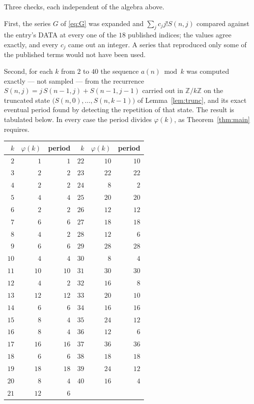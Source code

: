 \documentclass[11pt,a4paper]{article}
\theoremstyle{plain}
\theoremstyle{definition}
\begin{document}
Three checks, each independent of the algebra above.

First, the series $G$ of \eqref{eq:G} was expanded and $\sum_j c_j j! S(n,j)$ compared
against the entry's DATA at every one of the $18$ published indices; the values
agree exactly, and every $c_j$ came out an integer. A series that reproduced only some of
the published terms would not have been used.

Second, for each $k$ from $2$ to $40$ the sequence $a(n)\bmod k$ was computed exactly
--- not sampled --- from the recurrence $S(n,j)=j\,S(n-1,j)+S(n-1,j-1)$ carried out in
$\mathbb{Z}/k\mathbb{Z}$ on the truncated state
$\bigl(S(n,0),\dots,S(n,k-1)\bigr)$ of Lemma~\ref{lem:trunc}, and its exact eventual
period found by detecting the repetition of that state. The result is tabulated below.
In every case the period divides $\varphi(k)$, as Theorem~\ref{thm:main} requires.

\begin{center}\small
\begin{tabular}{rrr@{\qquad\qquad}rrr}
$k$ & $\varphi(k)$ & period & $k$ & $\varphi(k)$ & period \\ \hline
$2$ & $1$ & $1$ & $22$ & $10$ & $10$ \\
$3$ & $2$ & $2$ & $23$ & $22$ & $22$ \\
$4$ & $2$ & $2$ & $24$ & $8$ & $2$ \\
$5$ & $4$ & $4$ & $25$ & $20$ & $20$ \\
$6$ & $2$ & $2$ & $26$ & $12$ & $12$ \\
$7$ & $6$ & $6$ & $27$ & $18$ & $18$ \\
$8$ & $4$ & $2$ & $28$ & $12$ & $6$ \\
$9$ & $6$ & $6$ & $29$ & $28$ & $28$ \\
$10$ & $4$ & $4$ & $30$ & $8$ & $4$ \\
$11$ & $10$ & $10$ & $31$ & $30$ & $30$ \\
$12$ & $4$ & $2$ & $32$ & $16$ & $8$ \\
$13$ & $12$ & $12$ & $33$ & $20$ & $10$ \\
$14$ & $6$ & $6$ & $34$ & $16$ & $16$ \\
$15$ & $8$ & $4$ & $35$ & $24$ & $12$ \\
$16$ & $8$ & $4$ & $36$ & $12$ & $6$ \\
$17$ & $16$ & $16$ & $37$ & $36$ & $36$ \\
$18$ & $6$ & $6$ & $38$ & $18$ & $18$ \\
$19$ & $18$ & $18$ & $39$ & $24$ & $12$ \\
$20$ & $8$ & $4$ & $40$ & $16$ & $4$ \\
$21$ & $12$ & $6$ &  & & \\
\end{tabular}
\end{center}
\end{document}
